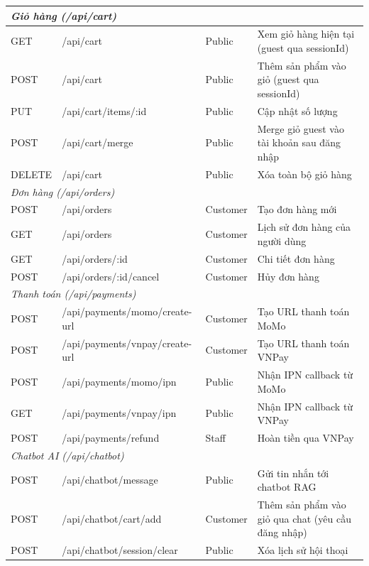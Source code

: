 {\begin{longtable}{|l|p{5.0cm}|l|p{4.5cm}|}
  \multicolumn{4}{|l|}{\textit{Giỏ hàng (/api/cart)}} \\
  \hline
  GET & /api/cart & Public & Xem giỏ hàng hiện tại (guest qua sessionId) \\
  \hline
  POST & /api/cart & Public & Thêm sản phẩm vào giỏ (guest qua sessionId) \\
  \hline
  PUT & /api/cart/items/:id & Public & Cập nhật số lượng \\
  \hline
  POST & /api/cart/merge & Public & Merge giỏ guest vào tài khoản sau đăng nhập \\
  \hline
  DELETE & /api/cart & Public & Xóa toàn bộ giỏ hàng \\
  \hline

  \multicolumn{4}{|l|}{\textit{Đơn hàng (/api/orders)}} \\
  \hline
  POST & /api/orders & Customer & Tạo đơn hàng mới \\
  \hline
  GET & /api/orders & Customer & Lịch sử đơn hàng của người dùng \\
  \hline
  GET & /api/orders/:id & Customer & Chi tiết đơn hàng \\
  \hline
  POST & /api/orders/:id/cancel & Customer & Hủy đơn hàng \\
  \hline

  \multicolumn{4}{|l|}{\textit{Thanh toán (/api/payments)}} \\
  \hline
  POST & /api/payments/momo/create-url & Customer & Tạo URL thanh toán MoMo \\
  \hline
  POST & /api/payments/vnpay/create-url & Customer & Tạo URL thanh toán VNPay \\
  \hline
  POST & /api/payments/momo/ipn & Public & Nhận IPN callback từ MoMo \\
  \hline
  GET & /api/payments/vnpay/ipn & Public & Nhận IPN callback từ VNPay \\
  \hline
  POST & /api/payments/refund & Staff & Hoàn tiền qua VNPay \\
  \hline

  \multicolumn{4}{|l|}{\textit{Chatbot AI (/api/chatbot)}} \\
  \hline
  POST & /api/chatbot/message & Public & Gửi tin nhắn tới chatbot RAG \\
  \hline
  POST & /api/chatbot/cart/add & Customer & Thêm sản phẩm vào giỏ qua chat (yêu cầu đăng nhập) \\
  \hline
  POST & /api/chatbot/session/clear & Public & Xóa lịch sử hội thoại \\
  \hline


\end{longtable}}
